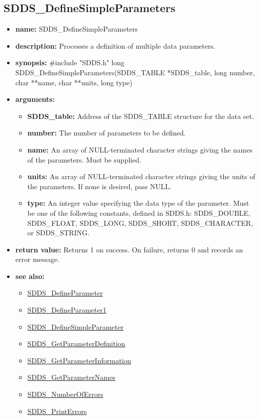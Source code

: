 \documentclass[11pt]{article}
\newcommand{\progref}[1]{\hyperref{SDDS_#1}{{\tt SDDS\_#1} (}{)}{SDDS_#1}}
\begin{document}
\subsection{SDDS\_DefineSimpleParameters}
\label{SDDS_DefineSimpleParameters}

\begin{itemize}
\item {\bf name:}\newline
SDDS\_DefineSimpleParameters
\item {\bf description:}\newline
Processes a definition of multiple data parameters.
\item {\bf synopsis:} \#include "SDDS.h"\newline
long SDDS\_DefineSimpleParameters(SDDS\_TABLE *SDDS\_table, long number, char **name, char **units, long type)
\item {\bf arguments:}
\begin{itemize}
\item {\bf SDDS\_table:} Address of the SDDS\_TABLE structure for the data set.
\item {\bf number:} The number of parameters to be defined.
\item {\bf name:} An array of NULL-terminated character strings giving the names of the parameters. Must be supplied.
\item {\bf units:} An array of NULL-terminated character strings giving the units of the parameters. If none is desired, pass NULL.
\item {\bf type:} An integer value specifying the data type of the parameter. Must be one of the following constants, defined in  SDDS.h: SDDS\_DOUBLE, SDDS\_FLOAT, SDDS\_LONG, SDDS\_SHORT, SDDS\_CHARACTER, or SDDS\_STRING.
\end{itemize}
\item {\bf return value:}\newline
Returns 1 on success. On failure, returns 0 and records an error message.
\item {\bf see also:}
\begin{itemize}
\item \progref{DefineParameter}
\item \progref{DefineParameter1}
\item \progref{DefineSimpleParameter}
\item \progref{GetParameterDefinition}
\item \progref{GetParameterInformation}
\item \progref{GetParameterNames}
\item \progref{NumberOfErrors}
\item \progref{PrintErrors}
\end{itemize}
\end{itemize}
\end{document}
